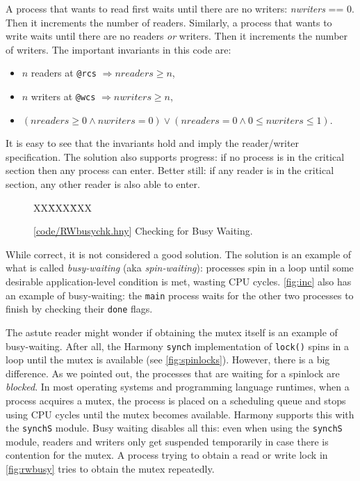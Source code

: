 \documentclass{report}
\newcommand{\harmonysource}[1]{
\begin{tabbing}
XX\=XXX\=XXX\kill
    
\end{tabbing}
}
\newcommand{\harmonylink}[1]{%
[\href{https://www.cs.cornell.edu/home/rvr/harmony/#1}{\underline{#1}}]%
}
\newenvironment{code}{
\tcolorbox
}{
\endtcolorbox
}
\begin{document}
A process that wants to read first waits until there are no writers:
\textit{nwriters} == 0.  Then it increments the number of readers.
Similarly, a
process that wants to write waits until there are no readers \emph{or} writers.
Then it increments the number of writers.
The important invariants in this code are:
\begin{itemize}
\item $n$ readers at \texttt{@rcs} $\Rightarrow \mathit{nreaders} \ge n$,
\item $n$ writers at \texttt{@wcs} $\Rightarrow \mathit{nwriters} \ge n$,
\item $(\mathit{nreaders} \ge 0 \land \mathit{nwriters} = 0) \lor
    (\mathit{nreaders} = 0 \land 0 \le \mathit{nwriters} \le 1)$.
\end{itemize}
It is easy to see that the invariants hold and imply the reader/writer
specification.
The solution also supports progress: if no process is in the critical
section then any process can enter.  Better still: if any reader is in the
critical section, any other reader is also able to enter.

\begin{figure}
\begin{code}
\harmonysource{RWbusychk}
\end{code}
\caption{\harmonylink{code/RWbusychk.hny} Checking for Busy Waiting.}
\label{fig:rwblock}
\end{figure}

%

While correct, it is not considered a good solution.
The solution is an example of what is called \emph{busy-waiting}
%
(aka \emph{spin-waiting}):
%
processes spin in a loop until some desirable application-level condition is met,
wasting CPU cycles.
\autoref{fig:inc} also has an example of busy-waiting: the \texttt{main}
process waits for the other two processes to finish by checking their \texttt{done}
flags.

The astute reader might wonder if obtaining the mutex itself is an
example of busy-waiting.  After all, the Harmony \texttt{synch} implementation
of \texttt{lock()} spins in a loop until the mutex is available
(see \autoref{fig:spinlocks}).
However, there is a big difference.  As we pointed out, the processes that
are waiting for a spinlock are \emph{blocked}.
In most operating systems and programming language runtimes,
when a process acquires a mutex, the process is placed on a scheduling
queue and stops using CPU cycles until the mutex becomes available.
Harmony supports this with the \texttt{synchS} module.
Busy waiting disables all this: even when using the \texttt{synchS}
module, readers and writers only get suspended temporarily in case
there is contention for the mutex.
A process trying to obtain a read or write lock in
\autoref{fig:rwbusy} tries to obtain the mutex repeatedly.
\end{document}
